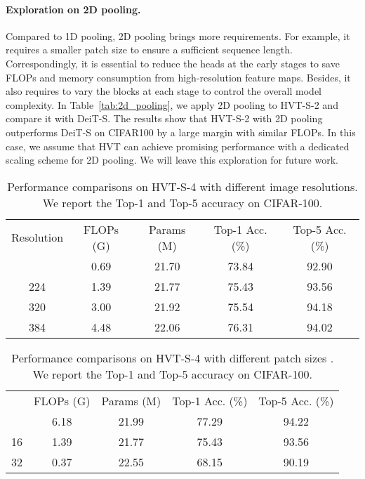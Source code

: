 \paragraph{Exploration on 2D pooling.}

Compared to 1D pooling, 2D pooling brings more requirements. For example, it requires a smaller patch size to ensure a sufficient sequence length. Correspondingly, it is essential to reduce the heads at the early stages to save FLOPs and memory consumption from high-resolution feature maps. Besides, it also requires to vary the blocks at each stage to control the overall model complexity. In Table~\ref{tab:2d_pooling}, we apply 2D pooling to HVT-S-2 and compare it with DeiT-S. The results show that HVT-S-2 with 2D pooling outperforms DeiT-S on CIFAR100 by a large margin with similar FLOPs. In this case, we assume that HVT can achieve promising performance with a dedicated scaling scheme for 2D pooling. We will leave this exploration for future work.


\begin{table}[]
\caption{Performance comparisons on HVT-S-4 with different image resolutions. We report the Top-1 and Top-5 accuracy on CIFAR-100.
}
\vspace{-5pt}
\renewcommand\arraystretch{1.1}
\resizebox{\columnwidth}{!} {
\begin{tabular}{ccc|cc}
Resolution & FLOPs (G) & Params (M) & Top-1 Acc. (\%)  & Top-5 Acc. (\%) \\ \shline
160 & 0.69 & 21.70 & 73.84 & 92.90 \\
224 & 1.39 & 21.77 & 75.43 & 93.56 \\
320 & 3.00 & 21.92 & 75.54 & 94.18 \\
384 & 4.48 & 22.06 & 76.31 & 94.02 \\ 
\end{tabular}
}
\label{tab:resolution}
\vspace{-12pt}
\end{table}



\begin{table}[]
\centering
\caption{Performance comparisons on HVT-S-4 with different patch sizes . We report the Top-1 and Top-5 accuracy on CIFAR-100.
}
\vspace{-5pt}
\renewcommand\arraystretch{1.1}
\resizebox{\columnwidth}{!} {
\begin{tabular}{@{}ccc|cc@{}}
 & FLOPs (G) & Params (M) & Top-1 Acc. (\%)  & Top-5 Acc. (\%) \\ \shline
8 & 6.18  & 21.99 & 77.29  & 94.22  \\ 
16 & 1.39 & 21.77 & 75.43  & 93.56 \\ 
32 & 0.37 & 22.55 & 68.15 & 90.19 \\
\end{tabular}
}
\label{tab:patch_size}
\vspace{-10pt}
\end{table}

